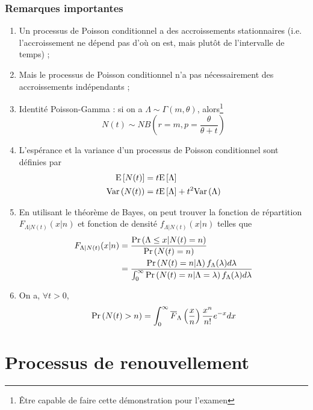 \documentclass[10pt, french, landscape]{article}
\begin{document}
\begin{multicols*}{3}
\subsubsection*{Remarques importantes}
\begin{enumerate}[label=(\arabic*)]
\item Un processus de Poisson conditionnel a des accroissements stationnaires (i.e. l'accroissement ne dépend pas d'où on est, mais plutôt de l'intervalle de temps) ; 
\item Mais le processus de Poisson conditionnel n'a pas nécessairement des accroissements indépendants ;
\item Identité Poisson-Gamma : si on a $\Lambda \sim \Gamma(m, \theta)$, alors\footnote{Être capable de faire cette démonstration pour l'examen}
\[N(t) \sim NB\left(r = m, p = \frac{\theta}{\theta + t} \right) \]

\item L'espérance et la variance d'un processus de Poisson conditionnel sont définies par
\begin{align*}
\mathrm{E} \left[ N(t) \right] & = t \mathrm{E} \left[ \Lambda \right] \\
\mathrm{Var} \left( N(t) \right) & =  t \mathrm{E} \left[ \Lambda \right] + t^2 \mathrm{Var} \left( \Lambda \right)
\end{align*}

\item En utilisant le théorème de Bayes, on peut trouver la fonction de répartition $F_{\Lambda | N(t)}(x | n)$ et fonction de densité $f_{\Lambda | N(t)}(x | n)$ telles que
\begin{align*}
F_{\Lambda | N(t)}(x | n)	& = \frac{\Pr \left( \Lambda \leq x | N(t) = n \right)}{\Pr \left( N(t) = n \right)} \\
& = \frac{\Pr \left( N(t) = n | \Lambda \right) f_\Lambda(\lambda) d \lambda}{\int_{0}^{\infty} \Pr \left( N(t) = n | \Lambda = \lambda \right) f_\Lambda(\lambda) d\lambda} \\
\end{align*}

\item On a, $\forall t > 0$,
\begin{align*}
\Pr \left( N(t) > n \right) = \int_{0}^{\infty} \overline{F}_{\Lambda}\left( \frac{x}{n} \right) \frac{x^n}{n!} e^{-x} dx
\end{align*}
\end{enumerate}

\section{Processus de renouvellement}

\end{multicols*}
\end{document}
